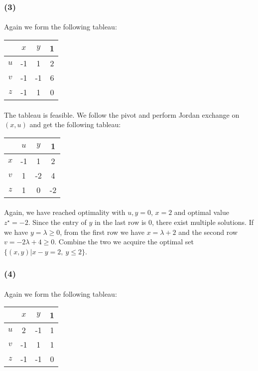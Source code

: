 \subsubsection*{(3)}
\paragraph{}
Again we form the following tableau:
\begin{center}
	\begin{tabular}{ c | c  c | c }
		\hline
		\   &$x$ & $y$& 1\\ \hline
		$u$ & -1 &  1 & 2\\ 
		$v$ & -1 & -1 & 6\\ \hline
		$z$ & -1 &  1 & 0\\
		\hline
	\end{tabular}
\end{center}
\paragraph{}
The tableau is feasible. We follow the pivot and perform Jordan exchange on $(x, u)$ and get the following tableau:
\begin{center}
	\begin{tabular}{ c | c  c | c }
		\hline
		\ &  $u$  & $y$ &  1\\ \hline
		$x$ & -1 &  1 &  2\\ 
		$v$ &  1 & -2 &  4\\ \hline
		$z$ &  1 &  0 & -2\\
		\hline
	\end{tabular}
\end{center}
\paragraph{}
Again, we have reached optimality with $u, y=0$, $x=2$ and optimal value $z^\star =-2$. Since the entry of $y$ in the last row is 0, there exist multiple solutions. If we have $y=\lambda \geq 0$, from the first row we have $x=\lambda+2$ and the second row $v=-2\lambda +4 \geq 0$. Combine the two we acquire the optimal set $\{(x,y)|x-y= 2,\ y\leq 2\}$.
\subsubsection*{(4)}
\paragraph{}
Again we form the following tableau:
\begin{center}
	\begin{tabular}{ c | c  c | c }
		\hline
		\ &  $x$  & $y$ &  1\\ \hline
		$u$ &  2 & -1 &  1\\ 
		$v$ & -1 &  1 &  1\\ \hline
		$z$ & -1 & -1 &  0\\
		\hline
	\end{tabular}
\end{center}
